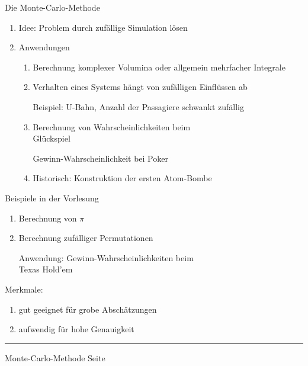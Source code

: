\documentclass{slides}
\newcounter{mypage}
\begin{document}

\begin{slide}{}
\normalsize

\begin{center}
Die Monte-Carlo-Methode
\end{center}

\footnotesize
\begin{enumerate}
\item Idee:  Problem durch zuf\"allige Simulation l\"osen
\item Anwendungen
      \begin{enumerate}
      \item Berechnung komplexer Volumina oder allgemein mehrfacher Integrale
      \item Verhalten eines Systems h\"angt von zuf\"alligen Einfl\"ussen ab

            Beispiel: U-Bahn, Anzahl der Passagiere schwankt zuf\"allig
      \item Berechnung von Wahrscheinlichkeiten beim \\
            Gl\"uckspiel

            Gewinn-Wahrscheinlichkeit bei Poker
      \item Historisch: Konstruktion der ersten Atom-Bombe
      \end{enumerate}
\end{enumerate}

Beispiele in der Vorlesung
\begin{enumerate}
\item Berechnung von $\pi$
\item Berechnung zuf\"alliger Permutationen 

      Anwendung: Gewinn-Wahrscheinlichkeiten beim \\
      Texas Hold'em
\end{enumerate}

Merkmale:
\begin{enumerate}
\item gut geeignet f\"ur grobe Absch\"atzungen
\item aufwendig f\"ur hohe Genauigkeit
\end{enumerate}


\vspace*{\fill}
\tiny \addtocounter{mypage}{1}
\rule{17cm}{1mm}
Monte-Carlo-Methode \hspace*{\fill} Seite 
\end{slide}
\end{document}
